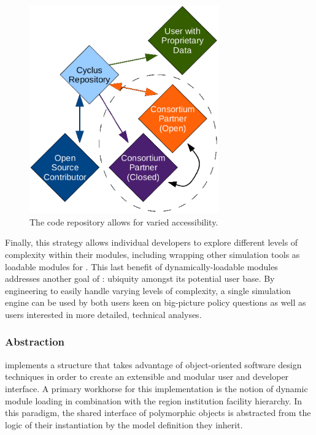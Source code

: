\begin{figure}[hp!]
  \begin{center}
    \includegraphics[height=9cm]{./chapters/paradigm/openness.eps}
  \end{center}
  \caption{The \Cyclus code repository allows for varied accessibility.}
  \label{fig:repo}
\end{figure}

Finally, this strategy allows individual developers to
explore different levels of complexity within their modules, including
wrapping other simulation tools as loadable modules for \Cyclus. This
last benefit of dynamically-loadable modules addresses another goal of
\Cyclus: ubiquity amongst its potential user base. By engineering
\Cyclus to easily handle varying levels of complexity, a single
simulation engine can be used by both users keen on big-picture policy
questions as well as users interested in more detailed, technical
analyses.

\subsubsection{Abstraction}

\Cyclus implements a structure that takes advantage of 
object-oriented software design techniques in order to create an 
extensible and modular user and developer interface. A primary 
workhorse for this implementation is the notion of dynamic module 
loading in combination with the region institution facility  
hierarchy. In this paradigm, the shared interface of polymorphic 
objects is abstracted from the logic of their instantiation by the 
model definition they inherit. 

